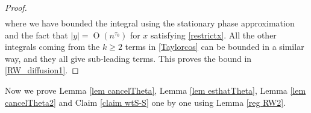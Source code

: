 \documentclass{article}
\newcommand{\1}{\mathds{1}}
\numberwithin{equation}{section}
\newcommand{\rd}{{\rm d}}
\renewcommand{\cal}{\mathcal}
\newcommand{\ii}{\mathrm{i}} %
\renewcommand{\leq}{\leqslant}
\renewcommand{\geq}{\geqslant}
\renewcommand{\le}{\leq}
\renewcommand{\ge}{\geq}
\DeclareMathOperator{\OO}{O}
\theoremstyle{plain} %
\theoremstyle{remark}
\begin{document}
\begin{proof}
\begin{align*}
\end{align*}
where we have bounded the integral using the stationary phase approximation and the fact that $|y|=\OO(n^{\tau_0})$ for $x$ satisfying \eqref{restrictx}. All the other integrals coming from the $k\ge 2$ terms in \eqref{Taylorcos} can be bounded in a similar way, and they all  give sub-leading terms. This proves the bound in \eqref{RW_diffusion1}.  
\end{proof} 

Now we prove Lemma \ref{lem cancelTheta}, Lemma \ref{lem esthatTheta}, Lemma \ref{lem cancelTheta2} and Claim \ref{claim wtS-S} one by one using Lemma \ref{reg RW2}.
\end{document}
